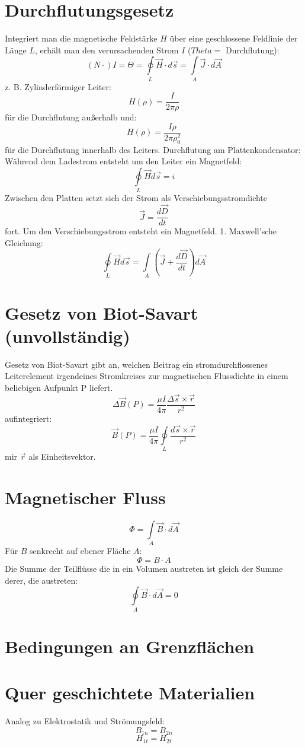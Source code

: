 \documentclass[12pt,a4paper]{article}
\begin{document}
\section{Durchflutungsgesetz}
Integriert man die magnetische Feldstärke $H$ über eine geschlossene Feldlinie der Länge $L$, erhält man den verursachenden Strom $I$ ($Theta = $ Durchflutung):
\[(N\cdot)I = \Theta = \oint\limits_L{\vec{H} \cdot d\vec{s}} = \int\limits_A{\vec{J}\cdot d\vec{A}}\]
z. B. Zylinderförmiger Leiter:
\[H(\rho)=\frac{I}{2\pi\rho}\]
für die Durchflutung außerhalb und:
\[H(\rho)=\frac{I\rho}{2\pi \rho_0^2}\]
für die Durchflutung innerhalb des Leiters.
Durchflutung am Plattenkondensator:
Während dem Ladestrom entsteht um den Leiter ein Magnetfeld:
\[\oint\limits_L{\vec{H} d\vec{s}} = i\]
Zwischen den Platten setzt sich der Strom als Verschiebungsstromdichte
\[\vec{J} = \frac{d\vec{D}}{dt}\]
fort. Um den Verschiebungsstrom entsteht ein Magnetfeld. 1. Maxwell'sche Gleichung:
\[\oint\limits_L{\vec{H}d\vec{s}} = \int\limits_A{(\vec{J} + \frac{d\vec{D}}{dt}) d\vec{A}}\]


\section{Gesetz von Biot-Savart (unvollständig)}
Gesetz von Biot-Savart gibt an, welchen Beitrag ein stromdurchflossenes Leiterelement irgendeines Stromkreises zur magnetischen Flussdichte in einem beliebigen Aufpunkt P liefert.
\[\Delta \vec{B}(P) = \frac{\mu I}{4\pi} \frac{\Delta \vec{s} \times \vec{r}}{r^2}\]
aufintegriert:
\[\vec{B}(P) = \frac{\mu I}{4 \pi} \oint\limits_L{\frac{d\vec{s} \times \vec{r}}{r^2}}\]
mir $\vec{r}$ als Einheitsvektor.

\section{Magnetischer Fluss}
\[\Phi = \int\limits_A{\vec{B} \cdot d \vec{A}}\]
Für $B$ senkrecht auf ebener Fläche $A$:
\[\Phi = B\cdot A\]
Die Summe der Teilflüsse die in ein Volumen austreten ist gleich der Summe derer, die austreten:
\[\oint\limits_A{\vec{B}\cdot d\vec{A}} = 0 \]

\section{Bedingungen an Grenzflächen}
\section{Quer geschichtete Materialien}
Analog zu Elektrostatik und Strömungsfeld:
\[B_{1n} = B_{2n}\]
\[H_{1t} = H_{2t}\]
\end{document}
